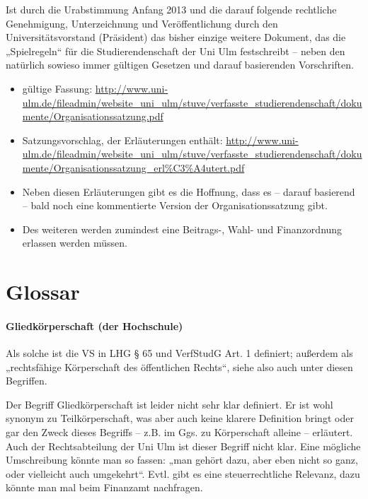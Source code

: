 \documentclass[
10pt,
a4paper,
twoside,								%
titlepage=false,							%
draft=false								%
]{scrartcl}
\begin{document}
Ist durch die Urabstimmung Anfang 2013 und die darauf folgende rechtliche Genehmigung, Unterzeichnung und Veröffentlichung durch den Universitätsvorstand (Präsident) das bisher einzige weitere Dokument, das die „Spielregeln“ für die Studierendenschaft der Uni Ulm festschreibt – neben den natürlich sowieso immer gültigen Gesetzen und darauf basierenden Vorschriften.

\begin{itemize}
	\item gültige Fassung: \sloppy  \url{http://www.uni-ulm.de/fileadmin/website_uni_ulm/stuve/verfasste_studierendenschaft/dokumente/Organisationssatzung.pdf}
	\item Satzungsvorschlag, der Erläuterungen enthält: \url{http://www.uni-ulm.de/fileadmin/website_uni_ulm/stuve/verfasste_studierendenschaft/dokumente/Organisationssatzung_erl%C3%A4utert.pdf}
	\item Neben diesen Erläuterungen gibt es die Hoffnung, dass es – darauf basierend – bald noch eine kommentierte Version der Organisationssatzung gibt.
	\item Des weiteren werden zumindest eine Beitrags-, Wahl- und Finanzordnung erlassen werden müssen.
\end{itemize}


\newpage
\section{Glossar}
\label{sec:Glossar}


\paragraph{Gliedkörperschaft (der Hochschule)}

Als solche ist die VS in LHG § 65 und VerfStudG Art. 1 definiert; außerdem als „rechtsfähige Körperschaft des öffentlichen Rechts“, siehe also auch unter diesen Begriffen.

Der Begriff Gliedkörperschaft ist leider nicht sehr klar definiert. Er ist wohl synonym zu Teilkörperschaft, was aber auch keine klarere Definition bringt oder gar den Zweck dieses Begriffs – z.B. im Ggs. zu Körperschaft alleine – erläutert. Auch der Rechtsabteilung der Uni Ulm ist dieser Begriff nicht klar. Eine mögliche Umschreibung könnte man so fassen: „man gehört dazu, aber eben nicht so ganz, oder vielleicht auch umgekehrt“. Evtl. gibt es eine steuerrechtliche Relevanz, dazu könnte man mal beim Finanzamt nachfragen.
\end{document}
